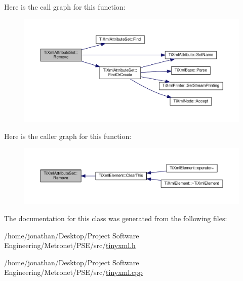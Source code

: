 Here is the call graph for this function\+:
\nopagebreak
\begin{figure}[H]
\begin{center}
\leavevmode
\includegraphics[width=350pt]{class_ti_xml_attribute_set_a924a73d071f2573f9060f0be57879c57_cgraph}
\end{center}
\end{figure}




Here is the caller graph for this function\+:
\nopagebreak
\begin{figure}[H]
\begin{center}
\leavevmode
\includegraphics[width=350pt]{class_ti_xml_attribute_set_a924a73d071f2573f9060f0be57879c57_icgraph}
\end{center}
\end{figure}




The documentation for this class was generated from the following files\+:\begin{DoxyCompactItemize}
\item 
/home/jonathan/\+Desktop/\+Project Software Engineering/\+Metronet/\+P\+S\+E/src/\hyperlink{tinyxml_8h}{tinyxml.\+h}\item 
/home/jonathan/\+Desktop/\+Project Software Engineering/\+Metronet/\+P\+S\+E/src/\hyperlink{tinyxml_8cpp}{tinyxml.\+cpp}\end{DoxyCompactItemize}
